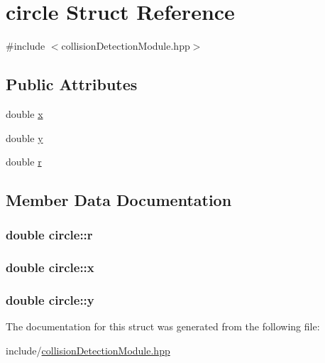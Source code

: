 \hypertarget{structcircle}{}\section{circle Struct Reference}
\label{structcircle}


{\ttfamily \#include $<$collision\+Detection\+Module.\+hpp$>$}

\subsection*{Public Attributes}
\begin{DoxyCompactItemize}
\item 
double \hyperlink{structcircle_a3ecd01f4a611905b29614e61d8c6f068}{x}
\item 
double \hyperlink{structcircle_ac060cb1d497b470df6be2d4242369f31}{y}
\item 
double \hyperlink{structcircle_a5f252f6cf93b81949dbf334c74931f18}{r}
\end{DoxyCompactItemize}


\subsection{Member Data Documentation}
\subsubsection[{\texorpdfstring{r}{r}}]{\setlength{\rightskip}{0pt plus 5cm}double circle\+::r}\hypertarget{structcircle_a5f252f6cf93b81949dbf334c74931f18}{}\label{structcircle_a5f252f6cf93b81949dbf334c74931f18}
\subsubsection[{\texorpdfstring{x}{x}}]{\setlength{\rightskip}{0pt plus 5cm}double circle\+::x}\hypertarget{structcircle_a3ecd01f4a611905b29614e61d8c6f068}{}\label{structcircle_a3ecd01f4a611905b29614e61d8c6f068}
\subsubsection[{\texorpdfstring{y}{y}}]{\setlength{\rightskip}{0pt plus 5cm}double circle\+::y}\hypertarget{structcircle_ac060cb1d497b470df6be2d4242369f31}{}\label{structcircle_ac060cb1d497b470df6be2d4242369f31}


The documentation for this struct was generated from the following file\+:\begin{DoxyCompactItemize}
\item 
include/\hyperlink{collisionDetectionModule_8hpp}{collision\+Detection\+Module.\+hpp}\end{DoxyCompactItemize}
